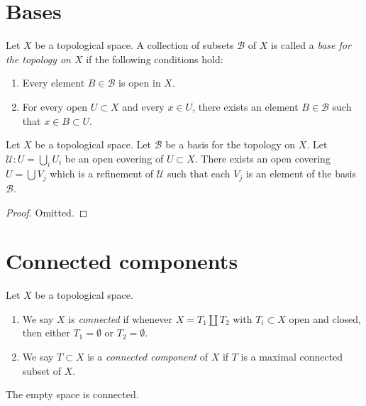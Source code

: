\section{Bases}
\label{section-bases}

\begin{definition}
\label{definition-base}
Let $X$ be a topological space.
A collection of subsets $\mathcal{B}$ of $X$ is called
a {\it base for the topology on $X$} if the following
conditions hold:
\begin{enumerate}
\item Every element $B \in \mathcal{B}$ is open in $X$.
\item For every open $U \subset X$ and every $x \in U$,
there exists an element $B \in \mathcal{B}$ such that
$x \in B \subset U$.
\end{enumerate}
\end{definition}

\begin{lemma}
\label{lemma-refine-covering-basis}
Let $X$ be a topological space.
Let $\mathcal{B}$ be a basis for the topology on $X$.
Let $\mathcal{U} : U = \bigcup_i U_i$ be an open covering of
$U \subset X$. There exists an open covering $U = \bigcup V_j$
which is a refinement of $\mathcal{U}$ such that each
$V_j$ is an element of the basis $\mathcal{B}$.
\end{lemma}

\begin{proof}
Omitted.
\end{proof}


\section{Connected components}
\label{section-connected-components}

\begin{definition}
\label{definition-connected-components}
Let $X$ be a topological space.
\begin{enumerate}
\item We say $X$ is {\it connected} if whenever $X = T_1 \coprod T_2$
with $T_i \subset X$ open and closed, then either $T_1 = \emptyset$ or
$T_2 = \emptyset$.
\item We say $T \subset X$ is a {\it connected component} of $X$ if
$T$ is a maximal connected subset of $X$.
\end{enumerate}
\end{definition}

\noindent
The empty space is connected.

